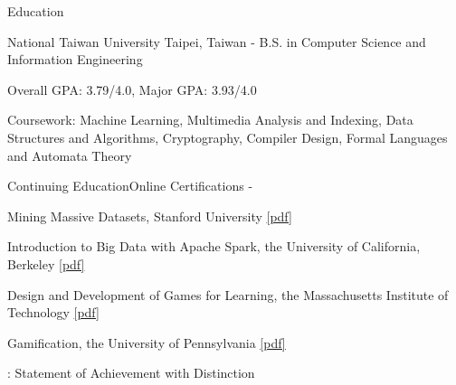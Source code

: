 \documentclass{cv}
\begin{document}
\begin{cvHeader} 
\end{cvHeader}


\begin{cvSection}{Education}

\begin{experienceSubsection}
{National Taiwan University}
{Taipei, Taiwan}
{ - }
{B.S. in Computer Science and Information Engineering}
\item Overall GPA: 3.79/4.0, Major GPA: 3.93/4.0
\item Coursework: Machine Learning, Multimedia Analysis and Indexing, Data Structures and Algorithms, Cryptography, Compiler Design, Formal Languages and Automata Theory
\end{experienceSubsection}

\begin{eduSubsection}{Continuing Education}{Online Certifications}{ - }
\item *Mining Massive Datasets, Stanford University \href{https://drive.google.com/uc?export=download&id=0B8Evfo4JjbBSTDFIa212ckQ4UUU}{[pdf]} %
\item Introduction to Big Data with Apache Spark, the University of California, Berkeley \href{https://s3.amazonaws.com/verify.edx.org/downloads/8e52b92f46154cddbecd6b089df1083e/Certificate.pdf}{[pdf]} %
\item Design and Development of Games for Learning, the Massachusetts Institute of Technology \href{https://s3.amazonaws.com/verify.edx.org/downloads/65152ce5fadb4f5d8b16add38babedaf/Certificate.pdf}{[pdf]} %
\item Gamification, the University of Pennsylvania \href{https://drive.google.com/uc?export=download&id=0B8Evfo4JjbBSZjFIdl9XMWFnVXM}{[pdf]} %

\hfill {\footnotesize *: Statement of Achievement with Distinction}

\end{eduSubsection}

\end{cvSection}
\end{document}
